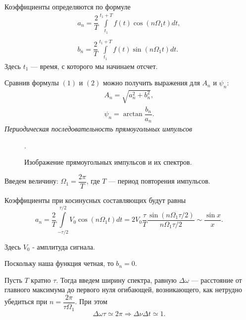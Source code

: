 \documentclass[a4paper, 12pt]{article}%
\begin{document}
	Коэффициенты определяются по формуле
	\begin{equation}
		\begin{array}{c}
			a_n  = \dfrac{2}{T}\int\limits_{t_1}^{t_1+T}f(t)\cos\left(n \Omega_1 t\right) dt,\\
			\\
			b_n = \dfrac{2}{T}\int\limits_{t_1}^{t_1+T}f(t)\sin\left(n \Omega_1 t\right) dt.
		\end{array}
	\end{equation}
	Здесь $t_1$ --- время, с которого мы начинаем отсчет.
	
	Сравнив формулы $(1)$ и $(2)$ можно получить выражения для $A_n$  и $\psi_n$:
	\begin{equation}
		\begin{array}{l}
			A_n = \sqrt{a_n^2+b_n^2},\\
			\psi_n = \arctan \dfrac{b_n}{a_n}.
		\end{array}
	\end{equation}
	\newpage
	\textit{Периодическая последовательность прямоугольных импульсов}\\
	
	\begin{figure}[H]
		.
		\caption{Изображение прямоугольных импульсов и их спектров.}
	\end{figure}
	Введем величину: $\Omega_1 = \dfrac{2\pi}{T}$,
	где $T$ --- период повторения импульсов.
	
	Коэффициенты при косинусных составляющих будут равны
	\begin{equation}
		a_n = \dfrac{2}{T}\int\limits_{-\tau/2}^{\tau/2}V_0\cos\left(n\Omega_1 t\right)dt = 2V_0\dfrac{\tau}{T}\dfrac{\sin\left(n\Omega_1\tau/2\right)}{n\Omega_1\tau/2} \sim \dfrac{\sin x}{x}.
	\end{equation}
	
	Здесь $V_0$ - амплитуда сигнала.
	
	Поскольку наша функция четная, то $b_n = 0$. 
	
	Пусть $T$ кратно $\tau$. Тогда введем ширину спектра, равную $\Delta \omega$ --- расстояние от главного максимума до первого нуля огибающей, возникающего, как нетрудно убедиться при $n = \dfrac{2\pi}{\tau \Omega_1}$. При 
	этом
	\begin{equation}
		\Delta \omega \tau \simeq 2\pi \Rightarrow \Delta \nu \Delta t \simeq 1.
	\end{equation}\\
\end{document}
